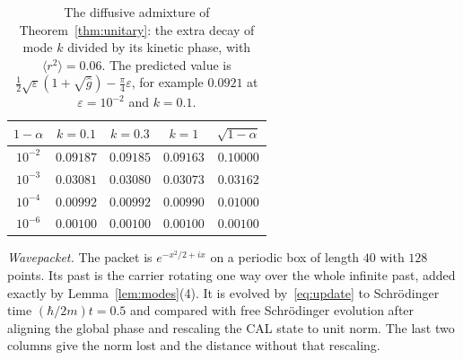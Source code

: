 \documentclass[11pt]{amsart}
\theoremstyle{definition}
\theoremstyle{remark}
\newcommand{\eps}{\varepsilon}
\begin{document}
\begin{table}[h]
\centering\small
\begin{tabular}{ccccc}
\toprule
$1-\alpha$ & $k=0.1$ & $k=0.3$ & $k=1$ & $\sqrt{1-\alpha}$\\
\midrule
$10^{-2}$ & $0.09187$ & $0.09185$ & $0.09163$ & $0.10000$\\
$10^{-3}$ & $0.03081$ & $0.03080$ & $0.03073$ & $0.03162$\\
$10^{-4}$ & $0.00992$ & $0.00992$ & $0.00990$ & $0.01000$\\
$10^{-6}$ & $0.00100$ & $0.00100$ & $0.00100$ & $0.00100$\\
\bottomrule
\end{tabular}
\caption{The diffusive admixture of Theorem~\ref{thm:unitary}: the extra decay of mode $k$ divided by its kinetic phase, with $\langle r^2\rangle=0.06$. The predicted value is $\tfrac12\sqrt\eps(1+\sqrt{\hat g})-\tfrac\pi4\eps$, for example $0.0921$ at $\eps=10^{-2}$ and $k=0.1$.}
\label{tab:diffusion}
\end{table}

\emph{Wavepacket.} The packet is $e^{-x^2/2+ix}$ on a periodic box of length $40$ with $128$ points. Its past is the carrier rotating one way over the whole infinite past, added exactly by Lemma~\ref{lem:modes}(4). It is evolved by~\eqref{eq:update} to Schr\"odinger time $(\hbar/2m)t=0.5$ and compared with free Schr\"odinger evolution after aligning the global phase and rescaling the CAL state to unit norm. The last two columns give the norm lost and the distance without that rescaling.
\end{document}
